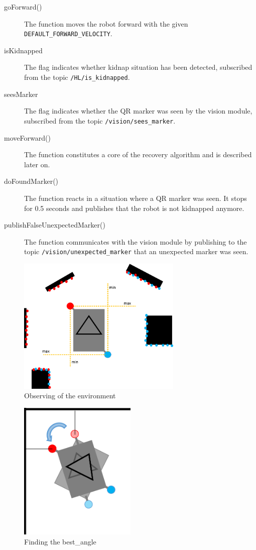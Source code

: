 \begin{description}
\item[goForward()] The function moves the robot forward with the given \texttt{DEFAULT\_FORWARD\_VELOCITY}.
\item[isKidnapped] The flag indicates whether kidnap situation has been detected, subscribed from the topic \texttt{/HL/is\_kidnapped}.
\item[seesMarker] The flag indicates whether the QR marker was seen by the vision module, subscribed from the topic \texttt{/vision/sees\_marker}.
\item[moveForward()] The function constitutes a core of the recovery algorithm and is described later on.
\item[doFoundMarker()] The function reacts in a situation where a QR marker was seen. It stops for 0.5 seconds and publishes that the robot is not kidnapped anymore.
\item[publishFalseUnexpectedMarker()] The function communicates with the vision module by publishing to the topic \texttt{/vision/unexpected\_marker} that an unexpected marker was seen.
\end{description}

\begin{figure}[ht]
\centering
\includegraphics[width=0.7\textwidth]{graphics/sensoren.png}
\caption{Observing of the environment}
\label{sensor}
\centering
\end{figure}

\begin{figure}[ht]
\centering
\includegraphics[width=0.5\textwidth]{graphics/find_best_angle.png}
\caption{Finding the best\_angle}
\label{best}
\centering
\end{figure}

